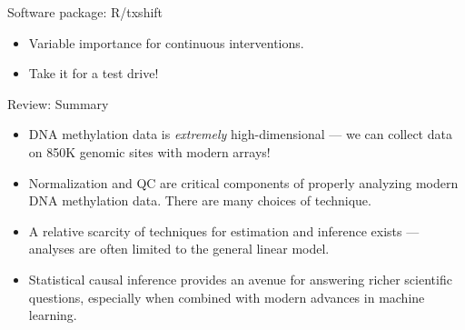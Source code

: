 \documentclass[12pt,t,handout]{beamer}
\begin{document}
\begin{frame}[c]{Software package: R/txshift}


\begin{center}
\begin{itemize}
  \itemsep4pt
  \item Variable importance for continuous interventions.
  \item Take it for a test drive!
\end{itemize}
\end{center}


\end{frame}


\begin{frame}[c]{Review: Summary}

\begin{center}
\begin{itemize}
  \itemsep10pt
  \item DNA methylation data is \textit{extremely} high-dimensional --- we can
    collect data on 850K genomic sites with modern arrays!
  \item Normalization and QC are critical components of properly analyzing
    modern DNA methylation data. There are many choices of technique.
  \item A relative scarcity of techniques for estimation and inference exists
    --- analyses are often limited to the general linear model.
  \item Statistical causal inference provides an avenue for answering richer
    scientific questions, especially when combined with modern advances in
    machine learning.
\end{itemize}
\end{center}


\end{frame}
\end{document}
